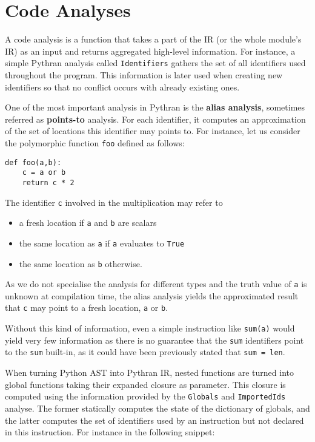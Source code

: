 \documentclass[10pt, onecolumn, preprint]{sigplanconf}
\begin{document}
\section{Code Analyses}
\label{sec:analysis}

A code analysis is a function that takes a part of the IR (or the whole
module's IR) as an input and returns aggregated high-level information. For
instance, a simple Pythran analysis called \texttt{Identifiers} gathers the set
of all identifiers used throughout the program. This information is later used
when creating new identifiers so that no conflict occurs with already existing ones.

One of the most important analysis in Pythran is the \textbf{alias analysis}, sometimes
referred as \textbf{points-to} analysis. For each identifier, it computes an
approximation of the set of locations this identifier may points to. For
instance, let us consider the polymorphic function \texttt{foo} defined as follows:

\begin{lstlisting}
def foo(a,b):
    c = a or b
    return c * 2
\end{lstlisting}

The identifier \texttt{c} involved in the multiplication may refer to

\begin{itemize}
    \item a fresh location if \texttt{a} and \texttt{b} are scalars

    \item the same location as \texttt{a} if \texttt{a} evaluates to \texttt{True}

    \item the same location as \texttt{b} otherwise.

\end{itemize}

As we do not specialise the analysis for different types and the truth value of
\texttt{a} is unknown at compilation time, the alias analysis yields %
the approximated result that \texttt{c} may point to a fresh location, 
\texttt{a} or \texttt{b}.

Without this kind of information, even a simple instruction like
\texttt{sum(a)} would yield very few information as there is no guarantee that
the \texttt{sum} identifiers point to the \texttt{sum} built-in, as it could have been 
previously stated that \texttt{sum = len}.

When turning Python AST into Pythran IR, nested functions are turned into
global functions taking their expanded closure as parameter. This closure is
computed using the information provided by the \texttt{Globals} and
\texttt{ImportedIds} analyse. The former statically computes the state of the
dictionary of globals, and the latter computes the set of identifiers used by
an instruction but not declared in this instruction. For instance in the
following snippet:
\end{document}
